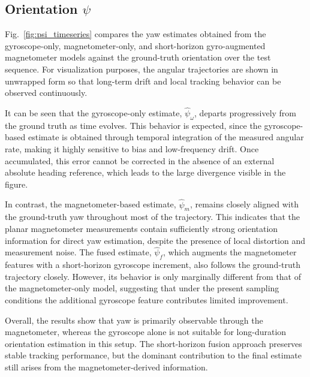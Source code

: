 \documentclass[subscriptcorrection,upint,varvw,barcolor=Goldenrod3,mathalfa=cal=euler,balance,hyphenate,pdf-a]{asmejour}
\begin{document}
\subsection{Orientation \(\psi\)}
Fig.~\ref{fig:psi_timeseries} compares the yaw estimates obtained from the gyroscope-only, magnetometer-only, and short-horizon gyro-augmented magnetometer models against the ground-truth orientation over the test sequence. For visualization purposes, the angular trajectories are shown in unwrapped form so that long-term drift and local tracking behavior can be observed continuously.

It can be seen that the gyroscope-only estimate, \(\hat{\psi}_{\omega}\), departs progressively from the ground truth as time evolves. This behavior is expected, since the gyroscope-based estimate is obtained through temporal integration of the measured angular rate, making it highly sensitive to bias and low-frequency drift. Once accumulated, this error cannot be corrected in the absence of an external absolute heading reference, which leads to the large divergence visible in the figure.

In contrast, the magnetometer-based estimate, \(\hat{\psi}_{m}\), remains closely aligned with the ground-truth yaw throughout most of the trajectory. This indicates that the planar magnetometer measurements contain sufficiently strong orientation information for direct yaw estimation, despite the presence of local distortion and measurement noise. The fused estimate, \(\hat{\psi}_{f}\), which augments the magnetometer features with a short-horizon gyroscope increment, also follows the ground-truth trajectory closely. However, its behavior is only marginally different from that of the magnetometer-only model, suggesting that under the present sampling conditions the additional gyroscope feature contributes limited improvement.

Overall, the results show that yaw is primarily observable through the magnetometer, whereas the gyroscope alone is not suitable for long-duration orientation estimation in this setup. The short-horizon fusion approach preserves stable tracking performance, but the dominant contribution to the final estimate still arises from the magnetometer-derived information.%
\end{document}
